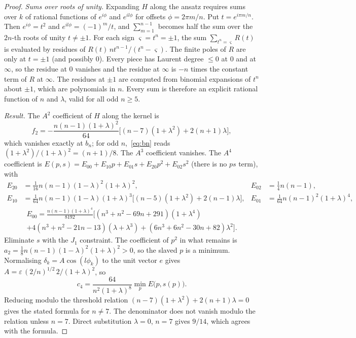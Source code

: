 \documentclass[11pt]{article}
\theoremstyle{definition}
\theoremstyle{remark}
\begin{document}
\begin{proof}
\emph{Sums over roots of unity.} Expanding $H$ along the ansatz requires sums over $k$ of rational
functions of $e^{i\phi}$ and $e^{il\phi}$ for offsets $\phi=2\pi m/n$. Put $t=e^{i\pi m/n}$. Then
$e^{i\phi}=t^2$ and $e^{il\phi}=(-1)^m/t$, and $\sum_{m=1}^{n-1}$ becomes half the sum over the $2n$-th
roots of unity $t\ne\pm1$. For each sign $\varsigma=t^n=\pm1$, the sum $\sum_{t^n=\varsigma}R(t)$ is
evaluated by residues of $R(t)\,nt^{n-1}/(t^n-\varsigma)$. The finite poles of $R$ are only at $t=\pm1$
(and possibly $0$). Every piece has Laurent degree $\le0$ at $0$ and at $\infty$, so the residue at $0$
vanishes and the residue at $\infty$ is $-n$ times the constant term of $R$ at $\infty$. The residues at
$\pm1$ are computed from binomial expansions of $t^n$ about $\pm1$, which are polynomials in $n$. Every
sum is therefore an explicit rational function of $n$ and $\lambda$, valid for all odd $n\ge5$.

\emph{Result.} The $A^2$ coefficient of $H$ along the kernel is
\[
f_2=-\frac{n(n-1)(1+\lambda)^2}{64}\big[(n-7)(1+\lambda^2)+2(n+1)\lambda\big],
\]
which vanishes exactly at $b_n$; for odd $n$,~\eqref{eq:bn} reads $(1+\lambda^2)/(1+\lambda)^2=(n+1)/8$.
The $A^3$ coefficient vanishes. The $A^4$ coefficient is
$E(p,s)=E_{00}+E_{10}p+E_{01}s+E_{20}p^2+E_{02}s^2$ (there is no $ps$ term), with
\begin{align*}
E_{20}&=\tfrac1{16}n(n-1)(1-\lambda)^2(1+\lambda)^2, &
E_{02}&=\tfrac14n(n-1), \\
E_{10}&=\tfrac1{64}n(n-1)(1-\lambda)(1+\lambda)^3\big[(n-5)(1+\lambda^2)+2(n-1)\lambda\big],&
E_{01}&=\tfrac1{64}n(n-1)^2(1+\lambda)^4,
\end{align*}
\begin{multline*}
E_{00}=\tfrac{n(n-1)(1+\lambda)^4}{8192}\Big[(n^3+n^2-69n+291)(1+\lambda^4)\\
+4(n^3+n^2-21n-13)(\lambda+\lambda^3)+(6n^3+6n^2-30n+82)\lambda^2\Big].
\end{multline*}
Eliminate $s$ with the $J_1$ constraint. The coefficient of $p^2$ in what remains is
$a_2=\tfrac18n(n-1)(1-\lambda)^2(1+\lambda)^2>0$, so the slaved $p$ is a minimum. Normalising
$\delta_k=A\cos(l\phi_k)$ to the unit vector $e$ gives $A=\varepsilon\,(2/n)^{1/2}\,2/(1+\lambda)^2$, so
\[
c_4=\frac{64}{n^2(1+\lambda)^8}\min_p E\big(p,s(p)\big).
\]
Reducing modulo the threshold relation $(n-7)(1+\lambda^2)+2(n+1)\lambda=0$ gives the stated formula for
$n\ne7$. The denominator does not vanish modulo the relation unless $n=7$. Direct substitution
$\lambda=0$, $n=7$ gives $9/14$, which agrees with the formula.
\end{proof}
\end{document}
